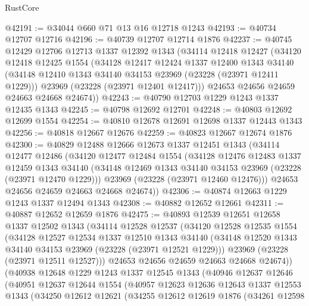 \begin{lexlean}{RustCore}
\begin{coremodule}
@42191 := @34044 @660 @71 @13 @16 @12718 @1243
@42193 := @40734 @12707 @12716
@42196 := @40739 @12707 @12714 @1876
@42237 := @40745
    @12429
    @12706
    @12713
    @1337
    @12392
    @1343
    (@34114
      @12418
      @12427
      (@34120
        @12418
        @12425
        @1554
        (@34128
          @12417
          @12424
          @1337
          @12400
          @1343
          @34140
          (@34148 @12410 @1343 @34140 @34153 @23969 (@23228 (@23971 @12411 @1229)))
          @23969
          (@23228 (@23971 @12401 @12417)))
        @24653
        @24656
        @24659
        @24663
        @24668
        @24674))
@42243 := @40790 @12703 @1229 @1243 @1337 @12435 @1343
@42245 := @40798 @12692 @12701
@42248 := @40803 @12692 @12699 @1554
@42254 := @40810 @12678 @12691 @12698 @1337 @12443 @1343
@42256 := @40818 @12667 @12676
@42259 := @40823 @12667 @12674 @1876
@42300 := @40829
    @12488
    @12666
    @12673
    @1337
    @12451
    @1343
    (@34114
      @12477
      @12486
      (@34120
        @12477
        @12484
        @1554
        (@34128
          @12476
          @12483
          @1337
          @12459
          @1343
          @34140
          (@34148 @12469 @1343 @34140 @34153 @23969 (@23228 (@23971 @12470 @1229)))
          @23969
          (@23228 (@23971 @12460 @12476)))
        @24653
        @24656
        @24659
        @24663
        @24668
        @24674))
@42306 := @40874 @12663 @1229 @1243 @1337 @12494 @1343
@42308 := @40882 @12652 @12661
@42311 := @40887 @12652 @12659 @1876
@42475 := @40893
    @12539
    @12651
    @12658
    @1337
    @12502
    @1343
    (@34114
      @12528
      @12537
      (@34120
        @12528
        @12535
        @1554
        (@34128
          @12527
          @12534
          @1337
          @12510
          @1343
          @34140
          (@34148 @12520 @1343 @34140 @34153 @23969 (@23228 (@23971 @12521 @1229)))
          @23969
          (@23228 (@23971 @12511 @12527)))
        @24653
        @24656
        @24659
        @24663
        @24668
        @24674))
    (@40938
      @12648
      @1229
      @1243
      @1337
      @12545
      @1343
      (@40946
        @12637
        @12646
        (@40951
          @12637
          @12644
          @1554
          (@40957
            @12623
            @12636
            @12643
            @1337
            @12553
            @1343
            (@34250
              @12612
              @12621
              (@34255
                @12612
                @12619
                @1876
                (@34261
                  @12598

\end{coremodule}
\end{lexlean}
